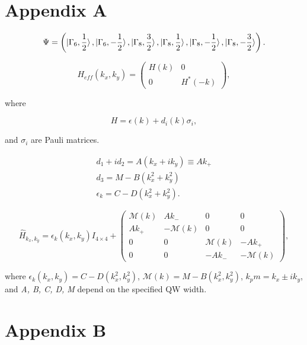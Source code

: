 \documentclass[titlepage,a4paper]{book}
\begin{document}
\appendix
\chapter{Appendix A}

\begin{equation}
\label{1}
\Psi = \left( \ket{\Gamma_6, \frac{1}{2}}, \ket{\Gamma_6, -\frac{1}{2}}, \ket{\Gamma_8, \frac{3}{2}}, \ket{\Gamma_8, \frac{1}{2}}, \ket{\Gamma_8, -\frac{1}{2}}, \ket{\Gamma_8, -\frac{3}{2}}  \right).
\end{equation}


\begin{equation}
\label{2}
H_{eff}(k_x, k_y) =  \left( \begin{array}{cc}
H(k) & 0 \\
0 & H^*(-k) \end{array} \right),
\end{equation}

where 

\begin{equation}
\label{3}
H = \epsilon (k) + d_i (k) \sigma_i,
\end{equation}

and $\sigma_i$ are Pauli matrices.

\begin{equation}
\begin{aligned}
\label{4}
d_1 + id_2 = A(k_x + ik_y) \equiv Ak_+ \\
d_3 = M - B(k_x^2 + k_y^2) \\
\epsilon_k = C - D(k_x^2 + k_y^2).
\end{aligned}
\end{equation}

\begin{equation}
\label{asd}
\hat{H}_{k_x, k_y} = \epsilon_k(k_x, k_y) I_{4 \times 4} + \left( \begin{array}{cccc}
\mathcal{M}(k) & Ak_- & 0 & 0 \\
Ak_+ & -\mathcal{M}(k) & 0 & 0 \\
0 & 0 & \mathcal{M}(k) & -Ak_+ \\
0 & 0 & -Ak_- & -\mathcal{M}(k) \end{array} \right),
\end{equation}

where $\epsilon_k(k_x, k_y) = C - D(k_x^2, k_y^2)$, $\mathcal{M}(k) = M - B(k_x^2, k_y^2)$, $k_pm = k_x \pm ik_y$, and \textit{A, B, C, D, M} depend on the specified QW width.

\chapter{Appendix B}
\end{document}
